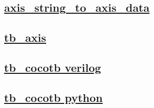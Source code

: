 \documentclass{article}
\begin{document}
  


  \subsection{\href{../files/axis_string_to_axis_data-v.html}{axis\_string\_to\_axis\_data}}
  \subsection{\href{../files2/tb_axis-v.html}{tb\_axis}}
  \subsection{\href{../files2/tb_cocotb-v.html}{tb\_cocotb verilog}}
  \subsection{\href{../files2/tb_cocotb-py.html}{tb\_cocotb python}}
\end{document}

